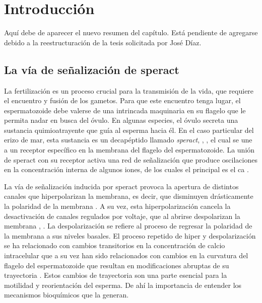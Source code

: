 \chapter{Introducci\'on}\label{ch:antecedentes}

Aquí debe de aparecer el nuevo resumen del capítulo. Está pendiente de agregarse debido a la reestructuración de la tesis solicitada por José Díaz.

\section{La v\'ia de se\~nalizaci\'on de speract}\label{sec:spSigNet}

La fertilización es un proceso crucial para la transmisión de la vida, que requiere el encuentro y fusión de los gametos. Para que este encuentro tenga lugar, el espermatozoide debe valerse de una intrincada maquinaria en su flagelo que le permita nadar en busca del óvulo. En algunas especies, el óvulo secreta una sustancia quimioatrayente que guía al esperma hacia él. En el caso particular del erizo de mar, esta sustancia es un decapéptido llamado \emph{speract}, \citeauthor{SUZUKI:1995gp} \citep{SUZUKI:1995gp}, \citeauthor{Hansbrough:1981vk} \citep{Hansbrough:1981vk}, el cual se une a un receptor específico en la membrana del flagelo del espermatozoide. La unión de speract con su receptor activa una red de señalización que produce oscilaciones en la concentración interna de algunos iones, de los cuales el principal es el \ac{ca} \citeauthor{Darszon2008} \citep{Darszon2008}. 

La vía de señalización inducida por speract provoca la apertura de distintos canales que hiperpolarizan la membrana, es decir, que disminuyen drásticamente la polaridad de la membrana \citeauthor{Kaupp:2008gv} \citep{Kaupp:2008gv}. A su vez, esta hiperpolarización cancela la desactivación de canales regulados por voltaje, que al abrirse despolarizan la membrana \citeauthor{Strunker:2006tk} \citep{Strunker:2006tk}, \citeauthor{GranadosGonzalez:2005ia} \citep{GranadosGonzalez:2005ia}. La despolarización se refiere al proceso de regresar la polaridad de la membrana a sus niveles basales. El proceso repetido de hiper y despolarización se ha relacionado con cambios transitorios en la concentración de calcio intracelular que a su vez han sido relacionados con cambios en la curvatura del flagelo del espermatozoide que resultan en modificaciones abruptas de su trayectoria \citeauthor{Darszon2008} \citep{Darszon2008}. Estos cambios de trayectoria son una parte esencial para la motilidad y reorientación del esperma. De ahí la importancia de entender los mecanismos bioquímicos que la generan. 

